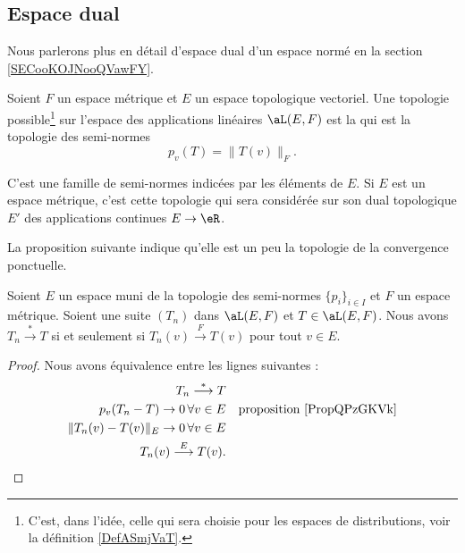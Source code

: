 \subsection{Espace dual}

Nous parlerons plus en détail d'espace dual d'un espace normé en la section \ref{SECooKOJNooQVawFY}.

\begin{definition}  \label{DefHUelCDD}
    Soient \( F\) un espace métrique et \( E\) un espace topologique vectoriel. Une topologie possible\footnote{C'est, dans l'idée, celle qui sera choisie pour les espaces de distributions, voir la définition \ref{DefASmjVaT}.} sur l'espace des applications linéaires \( \aL(E,F)\) est la  qui est la topologie des semi-normes
    \begin{equation}
        p_v(T)=\| T(v) \|_F.
    \end{equation}
\end{definition}
C'est une famille de semi-normes indicées par les éléments de \( E\). Si \( E\) est un espace métrique, c'est cette topologie qui sera considérée sur son dual topologique \( E'\) des applications continues \( E\to \eR\).

La proposition suivante indique qu'elle est un peu la topologie de la convergence ponctuelle.
\begin{proposition}
    Soient \( E\) un espace muni de la topologie des semi-normes \( \{ p_i \}_{i\in I}\) et \( F\) un espace métrique. Soient une suite \( (T_n)\) dans \( \aL(E,F)\) et \( T\in \aL(E,F)\). Nous avons \( T_n\stackrel{*}{\longrightarrow}T\) si et seulement si \( T_n(v)\stackrel{F}{\longrightarrow}T(v)\) pour tout \( v\in E\).
\end{proposition}

\begin{proof}
    Nous avons équivalence entre les lignes suivantes :
    \begin{subequations}
        \begin{align}
            T_n\stackrel{*}{\longrightarrow}T\\
            p_v(T_n-T)\to 0\,\forall v\in E &&\text{proposition \ref{PropQPzGKVk}}\\
            \| T_n(v)-T(v) \|_E\to 0\,\forall v\in E\\
            T_n(v)\stackrel{E}{\longrightarrow}T(v).
        \end{align}
    \end{subequations}
\end{proof}

